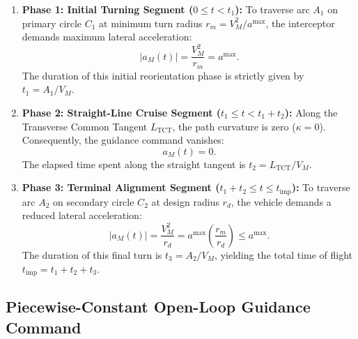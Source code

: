 \begin{enumerate}
    \item \textbf{Phase 1: Initial Turning Segment ($0 \le t < t_1$):} To traverse arc $A_1$ on primary circle $C_1$ at minimum turn radius $r_m = V_M^2 / a^{\max}$, the interceptor demands maximum lateral acceleration:
    \begin{equation}\label{eq:ch_DP_phase1_accel}
        |a_M(t)| = \frac{V_M^2}{r_m} = a^{\max}.
    \end{equation}
    The duration of this initial reorientation phase is strictly given by $t_1 = A_1 / V_M$.
    
    \item \textbf{Phase 2: Straight-Line Cruise Segment ($t_1 \le t < t_1 + t_2$):} Along the Transverse Common Tangent $L_{\text{TCT}}$, the path curvature is zero ($\kappa = 0$). Consequently, the guidance command vanishes:
    \begin{equation}\label{eq:ch_DP_phase2_accel}
        a_M(t) = 0.
    \end{equation}
    The elapsed time spent along the straight tangent is $t_2 = L_{\text{TCT}} / V_M$.
    
    \item \textbf{Phase 3: Terminal Alignment Segment ($t_1 + t_2 \le t \le t_{\text{imp}}$):} To traverse arc $A_2$ on secondary circle $C_2$ at design radius $r_d$, the vehicle demands a reduced lateral acceleration:
    \begin{equation}\label{eq:ch_DP_phase3_accel}
        |a_M(t)| = \frac{V_M^2}{r_d} = a^{\max} \left( \frac{r_m}{r_d} \right) \le a^{\max}.
    \end{equation}
    The duration of this final turn is $t_3 = A_2 / V_M$, yielding the total time of flight $t_{\text{imp}} = t_1 + t_2 + t_3$.
\end{enumerate}
\subsection{Piecewise-Constant Open-Loop Guidance Command}\label{subsec:ch_DP_open_loop}

